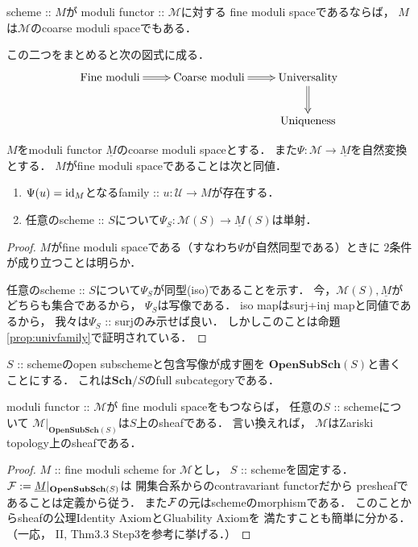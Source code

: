 \documentclass[a4paper]{jsarticle}
\newcommand{\Sch}{\mathbf{Sch}}
\newcommand{\OpenSubSch}{\mathbf{OpenSubSch}}
\newcommand{\famU}{\mathcal{U}}
\newcommand{\ftor}[1]{\underline{#1}}
\newcommand{\ftorM}{\mathcal{M}}
\begin{document}
    \begin{Prop}
        scheme :: $M$が
        moduli functor :: $\ftorM$に対する
        fine moduli spaceであるならば，
        $M$は$\ftorM$のcoarse moduli spaceでもある．
    \end{Prop}
    この二つをまとめると次の図式に成る．
    \[\xymatrix{
        \text{Fine moduli} \ar@{=>}[r]& \text{Coarse moduli} \ar@{=>}[r]& \text{Universality} \ar@{=>}[d]\\
        {} & {} & \text{Uniqueness}
    }\]

    \begin{Prop}
        $M$をmoduli functor $\ftor{M}$のcoarse moduli spaceとする．
        また$\Psi: \ftorM \to \ftor{M}$を自然変換とする．
        $M$がfine moduli spaceであることは次と同値．
        \begin{enumerate}
            \item $\Psi(u)=\id[M]$となるfamily :: $u: \famU \to M$が存在する．
            \item 任意のscheme :: $S$について$\Psi_S: \ftorM(S) \to \ftor{M}(S)$は単射．
        \end{enumerate}
    \end{Prop}
    \begin{proof}
        $M$がfine moduli spaceである（すなわち$\Psi$が自然同型である）ときに
        $2$条件が成り立つことは明らか．

        任意のscheme :: $S$について$\Psi_S$が同型(iso)であることを示す．
        今，$\ftorM(S), \ftor{M}$がどちらも集合であるから，
        $\Psi_S$は写像である．
        iso mapはsurj+inj mapと同値であるから，
        我々は$\Psi_S$ :: surjのみ示せば良い．
        しかしこのことは命題\ref{prop:univfamily}で証明されている．
    \end{proof}
    
    \begin{Prop}
        $S$ :: schemeのopen subschemeと包含写像が成す圏を
        $\OpenSubSch(S)$と書くことにする．
        これは$\Sch/S$のfull subcategoryである．

        moduli functor :: $\ftorM$が
        fine moduli spaceをもつならば，
        任意の$S$ :: schemeについて
        $\ftorM|_{\OpenSubSch(S)}$は$S$上のsheafである．
        言い換えれば，
        $\ftorM$はZariski topology上のsheafである．
    \end{Prop}
    \begin{proof}
        $M$ :: fine moduli scheme for $\ftorM$とし，
        $S$ :: schemeを固定する．
        $\shF:=\ftor{M}|_{\OpenSubSch(S)}$は
        開集合系からのcontravariant functorだから
        presheafであることは定義から従う．
        また$\shF$の元はschemeのmorphismである．
        このことからsheafの公理Identity AxiomとGluability Axiomを
        満たすことも簡単に分かる．
        （一応，\cite{HarAG} II, Thm3.3 Step3を参考に挙げる．）
    \end{proof}
\end{document}
